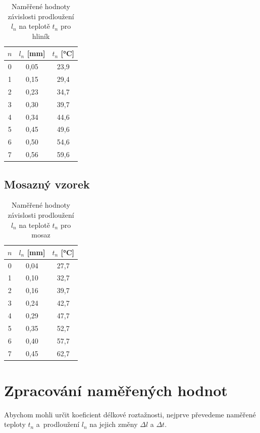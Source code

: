 \documentclass[a4paper,12pt]{article}
\begin{document}
\begin{table}[H]
\centering
\renewcommand{\arraystretch}{1.5}
\begin{tabular}{|c|c|c|}
\hline
$n$ & $l_n$ [mm] & $t_n$ [°C] \\
\hline
0 & 0{,}05 & 23{,}9 \\
1 & 0{,}15 & 29{,}4 \\
2 & 0{,}23 & 34{,}7 \\
3 & 0{,}30 & 39{,}7 \\
4 & 0{,}34 & 44{,}6 \\
5 & 0{,}45 & 49{,}6 \\
6 & 0{,}50 & 54{,}6 \\
7 & 0{,}56 & 59{,}6 \\
\hline
\end{tabular}
\caption{Naměřené hodnoty závislosti prodloužení $l_n$ na teplotě $t_n$ pro hliník}
\label{tab:hlinik}
\end{table}


\subsection{Mosazný vzorek}

\begin{table}[H]
\centering
\renewcommand{\arraystretch}{1.5}
\begin{tabular}{|c|c|c|}
\hline
$n$ & $l_n$ [mm] & $t_n$ [°C] \\
\hline
0 & 0{,}04 & 27{,}7 \\
1 & 0{,}10 & 32{,}7 \\
2 & 0{,}16 & 39{,}7 \\
3 & 0{,}24 & 42{,}7 \\
4 & 0{,}29 & 47{,}7 \\
5 & 0{,}35 & 52{,}7 \\
6 & 0{,}40 & 57{,}7 \\
7 & 0{,}45 & 62{,}7 \\
\hline
\end{tabular}
\caption{Naměřené hodnoty závislosti prodloužení $l_n$ na teplotě $t_n$ pro mosaz}
\label{tab:mosaz}
\end{table}


\newpage
\section{Zpracování naměřených hodnot}
Abychom mohli určit koeficient délkové roztažnosti, nejprve převedeme naměřené teploty $t_n$ a~prodloužení $l_n$ na jejich změny $\Delta l$ a $\Delta t$.
\end{document}
